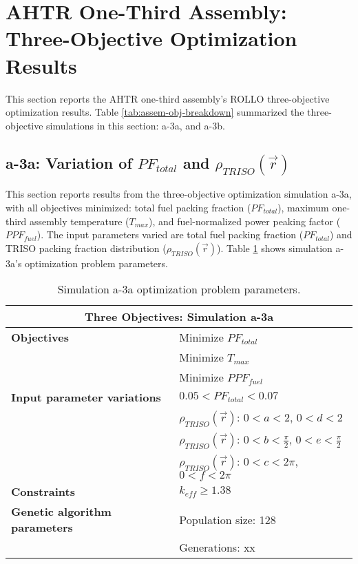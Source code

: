 \pagebreak
\section{AHTR One-Third Assembly: Three-Objective Optimization Results}
\label{assem-three-obj}
This section reports the \gls{AHTR} one-third assembly's \gls{ROLLO} three-objective 
optimization results. 
Table \ref{tab:assem-obj-breakdown} summarized the three-objective simulations in this 
section: a-3a, and a-3b. 

\subsection{a-3a: Variation of $PF_{total}$ and $\rho_{TRISO}(\vec{r})$}
\label{sec:a-3a}
This section reports results from the three-objective optimization simulation a-3a, 
with all objectives minimized: total fuel packing fraction ($PF_{total}$), 
maximum one-third assembly temperature ($T_{max}$), and fuel-normalized power peaking 
factor ($PPF_{fuel}$).  
The input parameters varied are total fuel packing fraction ($PF_{total}$) and 
TRISO packing fraction distribution ($\rho_{TRISO}(\vec{r})$). 
Table \ref{tab:simulationa3a} shows simulation a-3a's optimization problem parameters. 
\begin{table}[htbp!]
    \centering
    \onehalfspacing
    \caption{Simulation a-3a optimization problem parameters.}
	\label{tab:simulationa3a}
    \footnotesize
    \begin{tabular}{l|p{5.3cm}}
    \hline 
    \multicolumn{2}{c}{\textbf{Three Objectives: Simulation a-3a}} \\
    \hline 
    \textbf{Objectives} & Minimize $PF_{total}$ \\
    & Minimize $T_{max}$ \\
    & Minimize $PPF_{fuel}$ \\
    \hline 
    \textbf{Input parameter variations} & $0.05<PF_{total}<0.07$ \\
    & $\rho_{TRISO}(\vec{r})$: $0<a<2$, $0<d<2$\\
    & $\rho_{TRISO}(\vec{r})$: $0<b<\frac{\pi}{2}$, $0<e<\frac{\pi}{2}$\\
    & $\rho_{TRISO}(\vec{r})$: $0<c<2\pi$, $0<f<2\pi$\\
    \hline
    \textbf{Constraints} & $k_{eff} \geq 1.38$\\ 
    \hline 
    \textbf{Genetic algorithm parameters} & Population size: 128 \\
    & Generations: xx \\
    \hline
    \end{tabular}
\end{table}


